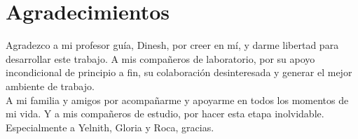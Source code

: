 \chapter*{Agradecimientos}
Agradezco a mi profesor guía, Dinesh, por creer en mí, y darme libertad para desarrollar este trabajo. A mis compañeros de laboratorio, por su apoyo incondicional de principio a fin, su colaboración desinteresada y generar el mejor ambiente de trabajo.\\
A mi familia y amigos por acompañarme y apoyarme en todos los momentos de mi vida. Y a mis compañeros de estudio, por hacer esta etapa inolvidable. Especialmente a Yelnith, Gloria y Roca, gracias.



